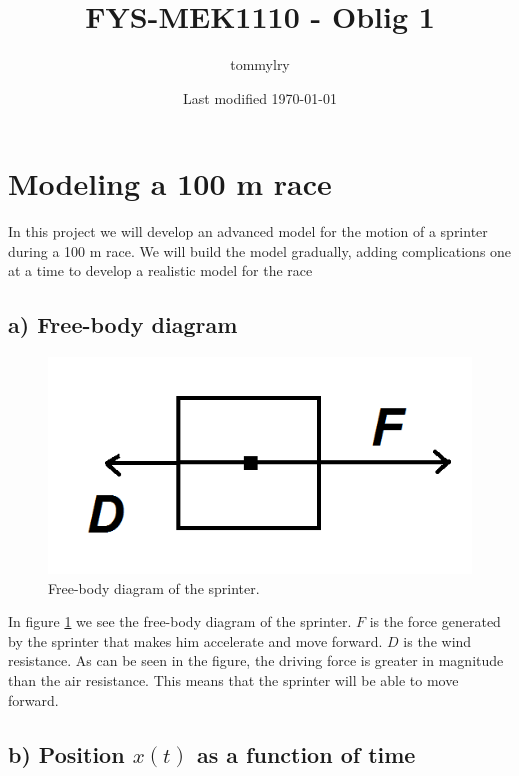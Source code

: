 \documentclass[a4paper,10pt,english]{article}
\title{FYS-MEK1110 - Oblig 1}
\author{tommylry}
\date{Last modified \today}
\begin{document}
\maketitle

\section{Modeling a 100 m race}

In this project we will develop an advanced model for the motion of a sprinter during a 100 m race. We will build the model gradually, adding complications one at a time to develop a realistic model for the race

\subsection*{a) Free-body diagram}

\begin{figure}[h!]
        \centering 
        \includegraphics[scale=0.8]{a.png} 
        \caption{Free-body diagram of the sprinter.}
        \label{fig:a}
\end{figure}

In figure \ref{fig:a} we see the free-body diagram of the sprinter. $F$ is the force generated by the sprinter that makes him accelerate and move forward. $D$ is the wind resistance. As can be seen in the figure, the driving force is greater in magnitude than the air resistance. This means that the sprinter will be able to move forward. 


\subsection*{b) Position $x(t)$ as a function of time}
\end{document}
